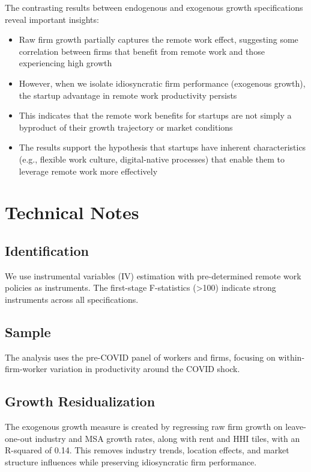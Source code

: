 \documentclass[11pt]{article}
\begin{document}
The contrasting results between endogenous and exogenous growth specifications reveal important insights:
\begin{itemize}
\item Raw firm growth partially captures the remote work effect, suggesting some correlation between firms that benefit from remote work and those experiencing high growth
\item However, when we isolate idiosyncratic firm performance (exogenous growth), the startup advantage in remote work productivity persists
\item This indicates that the remote work benefits for startups are not simply a byproduct of their growth trajectory or market conditions
\item The results support the hypothesis that startups have inherent characteristics (e.g., flexible work culture, digital-native processes) that enable them to leverage remote work more effectively
\end{itemize}

\section{Technical Notes}

\subsection{Identification}
We use instrumental variables (IV) estimation with pre-determined remote work policies as instruments. The first-stage F-statistics (>100) indicate strong instruments across all specifications.

\subsection{Sample}
The analysis uses the pre-COVID panel of workers and firms, focusing on within-firm-worker variation in productivity around the COVID shock.

\subsection{Growth Residualization}
The exogenous growth measure is created by regressing raw firm growth on leave-one-out industry and MSA growth rates, along with rent and HHI tiles, with an R-squared of 0.14. This removes industry trends, location effects, and market structure influences while preserving idiosyncratic firm performance.
\end{document}
